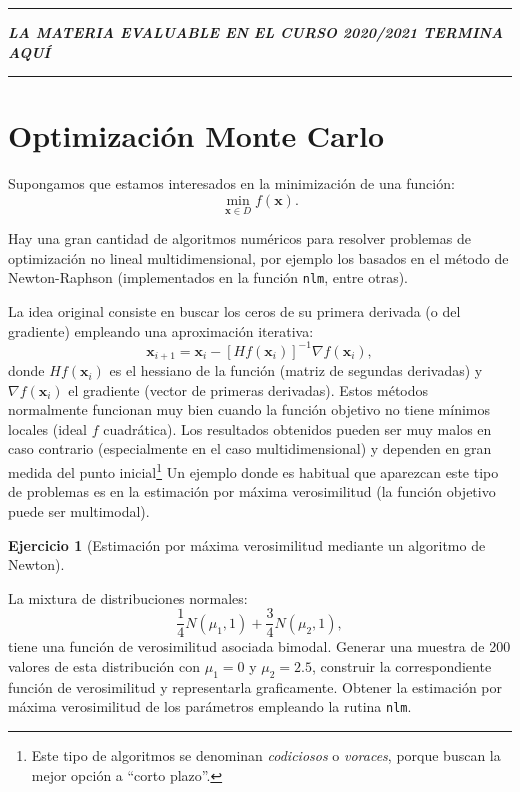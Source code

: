 \documentclass[
]{book}
\theoremstyle{break}
\theoremstyle{definition}
\theoremstyle{definition}
\theoremstyle{definition}
\newtheorem{exercise}{Ejercicio}[chapter]
\theoremstyle{definition}
\theoremstyle{remark}
\begin{document}
\begin{center}\rule{0.5\linewidth}{0.5pt}\end{center}

\textbf{\emph{LA MATERIA EVALUABLE EN EL CURSO 2020/2021 TERMINA AQUÍ}}

\begin{center}\rule{0.5\linewidth}{0.5pt}\end{center}

\hypertarget{optimizaciuxf3n-monte-carlo}{%
\section{Optimización Monte Carlo}\label{optimizaciuxf3n-monte-carlo}}

Supongamos que estamos interesados en la minimización de una función:
\[\underset{\mathbf{x}\in D}{\min }f(\mathbf{x}).\]

Hay una gran cantidad de algoritmos numéricos para resolver problemas de optimización no lineal multidimensional, por ejemplo los basados en el método de Newton-Raphson
(implementados en la función \texttt{nlm}, entre otras).

La idea original consiste en buscar los ceros de su primera derivada (o del gradiente) empleando una aproximación iterativa:
\[\mathbf{x}_{i+1} = \mathbf{x}_i-[Hf(\mathbf{x}_i)]^{-1}\nabla f(\mathbf{x}_i),\]
donde \(Hf(\mathbf{x}_i)\) es el hessiano de la función (matriz de segundas derivadas) y \(\nabla f(\mathbf{x}_i)\) el gradiente (vector de primeras derivadas).
Estos métodos normalmente funcionan muy bien cuando la función objetivo no tiene mínimos locales (ideal \(f\) cuadrática).
Los resultados obtenidos pueden ser muy malos en caso contrario (especialmente en el caso multidimensional) y dependen en gran medida del punto inicial\footnote{Este tipo de algoritmos se denominan \emph{codiciosos} o \emph{voraces}, porque buscan la mejor opción a ``corto plazo''.}
Un ejemplo donde es habitual que aparezcan este tipo de problemas es en la estimación por máxima verosimilitud (la función objetivo puede ser multimodal).

\begin{exercise}[Estimación por máxima verosimilitud mediante un algoritmo de Newton]
\protect\hypertarget{exr:mv-nlm}{}{\label{exr:mv-nlm} {} }
\end{exercise}

La mixtura de distribuciones normales:
\[\frac1{4}N(\mu_1,1)+\frac{3}{4}N(\mu_2,1),\]
tiene una función de verosimilitud asociada bimodal.
Generar una muestra de 200 valores de esta distribución con \(\mu_1=0\) y \(\mu_2=2.5\), construir la correspondiente
función de verosimilitud y representarla graficamente.
Obtener la estimación por máxima verosimilitud de los parámetros empleando la rutina \texttt{nlm}.
\end{document}
